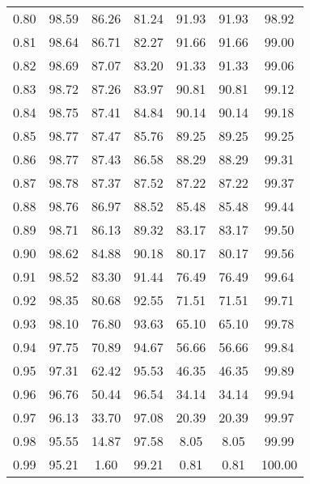 \begin{tabular}{|c|c|c|c|c|c|c|}
      0.80 &     98.59 &     86.26 &      81.24 &   91.93 &      91.93 &         98.92 \\
      0.81 &     98.64 &     86.71 &      82.27 &   91.66 &      91.66 &         99.00 \\
      0.82 &     98.69 &     87.07 &      83.20 &   91.33 &      91.33 &         99.06 \\
      0.83 &     98.72 &     87.26 &      83.97 &   90.81 &      90.81 &         99.12 \\
      0.84 &     98.75 &     87.41 &      84.84 &   90.14 &      90.14 &         99.18 \\
      0.85 &     98.77 &     87.47 &      85.76 &   89.25 &      89.25 &         99.25 \\
      0.86 &     98.77 &     87.43 &      86.58 &   88.29 &      88.29 &         99.31 \\
      0.87 &     98.78 &     87.37 &      87.52 &   87.22 &      87.22 &         99.37 \\
      0.88 &     98.76 &     86.97 &      88.52 &   85.48 &      85.48 &         99.44 \\
      0.89 &     98.71 &     86.13 &      89.32 &   83.17 &      83.17 &         99.50 \\
      0.90 &     98.62 &     84.88 &      90.18 &   80.17 &      80.17 &         99.56 \\
      0.91 &     98.52 &     83.30 &      91.44 &   76.49 &      76.49 &         99.64 \\
      0.92 &     98.35 &     80.68 &      92.55 &   71.51 &      71.51 &         99.71 \\
      0.93 &     98.10 &     76.80 &      93.63 &   65.10 &      65.10 &         99.78 \\
      0.94 &     97.75 &     70.89 &      94.67 &   56.66 &      56.66 &         99.84 \\
      0.95 &     97.31 &     62.42 &      95.53 &   46.35 &      46.35 &         99.89 \\
      0.96 &     96.76 &     50.44 &      96.54 &   34.14 &      34.14 &         99.94 \\
      0.97 &     96.13 &     33.70 &      97.08 &   20.39 &      20.39 &         99.97 \\
      0.98 &     95.55 &     14.87 &      97.58 &    8.05 &       8.05 &         99.99 \\
      0.99 &     95.21 &      1.60 &      99.21 &    0.81 &       0.81 &        100.00 \\
\bottomrule
\end{tabular}
